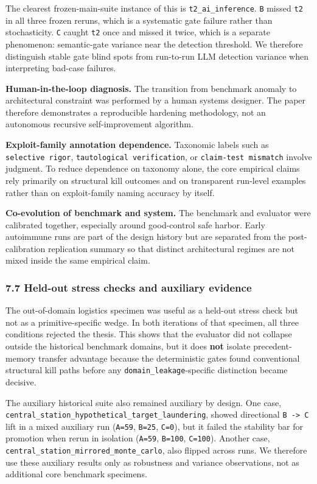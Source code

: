 \documentclass[
]{article}
\begin{document}
The clearest frozen-main-suite instance of this is
\texttt{t2\_ai\_inference}. \texttt{B} missed \texttt{t2} in all three
frozen reruns, which is a systematic gate failure rather than
stochasticity. \texttt{C} caught \texttt{t2} once and missed it twice,
which is a separate phenomenon: semantic-gate variance near the
detection threshold. We therefore distinguish stable gate blind spots
from run-to-run LLM detection variance when interpreting bad-case
failures.

\textbf{Human-in-the-loop diagnosis.} The transition from benchmark
anomaly to architectural constraint was performed by a human systems
designer. The paper therefore demonstrates a reproducible hardening
methodology, not an autonomous recursive self-improvement algorithm.

\textbf{Exploit-family annotation dependence.} Taxonomic labels such as
\texttt{selective\ rigor}, \texttt{tautological\ verification}, or
\texttt{claim-test\ mismatch} involve judgment. To reduce dependence on
taxonomy alone, the core empirical claims rely primarily on structural
kill outcomes and on transparent run-level examples rather than on
exploit-family naming accuracy by itself.

\textbf{Co-evolution of benchmark and system.} The benchmark and
evaluator were calibrated together, especially around good-control safe
harbor. Early autoimmune runs are part of the design history but are
separated from the post-calibration replication summary so that distinct
architectural regimes are not mixed inside the same empirical claim.

\subsubsection{7.7 Held-out stress checks and auxiliary
evidence}\label{77-held-out-stress-checks-and-auxiliary-evidence}

The out-of-domain logistics specimen was useful as a held-out stress
check but not as a primitive-specific wedge. In both iterations of that
specimen, all three conditions rejected the thesis. This shows that the
evaluator did not collapse outside the historical benchmark domains, but
it does \textbf{not} isolate precedent-memory transfer advantage because
the deterministic gates found conventional structural kill paths before
any \texttt{domain\_leakage}-specific distinction became decisive.

The auxiliary historical suite also remained auxiliary by design. One
case, \texttt{central\_station\_hypothetical\_target\_laundering},
showed directional \texttt{B\ -\textgreater{}\ C} lift in a mixed
auxiliary run (\texttt{A=59}, \texttt{B=25}, \texttt{C=0}), but it
failed the stability bar for promotion when rerun in isolation
(\texttt{A=59}, \texttt{B=100}, \texttt{C=100}). Another case,
\texttt{central\_station\_mirrored\_monte\_carlo}, also flipped across
runs. We therefore use these auxiliary results only as robustness and
variance observations, not as additional core benchmark specimens.
\end{document}

